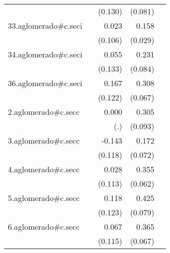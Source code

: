 {\begin{longtable}{l*{4}{D{.}{.}{-1}}}
            &                     &     (0.130)         &     (0.081)         &                     \\
\addlinespace
33.aglomerado#c.seci&                     &       0.023         &       0.158\sym{***}&                     \\
            &                     &     (0.106)         &     (0.029)         &                     \\
\addlinespace
34.aglomerado#c.seci&                     &       0.055         &       0.231\sym{**} &                     \\
            &                     &     (0.133)         &     (0.084)         &                     \\
\addlinespace
36.aglomerado#c.seci&                     &       0.167         &       0.308\sym{***}&                     \\
            &                     &     (0.122)         &     (0.067)         &                     \\
\addlinespace
2.aglomerado#c.secc&                     &       0.000         &       0.305\sym{**} &                     \\
            &                     &         (.)         &     (0.093)         &                     \\
\addlinespace
3.aglomerado#c.secc&                     &      -0.143         &       0.172\sym{*}  &                     \\
            &                     &     (0.118)         &     (0.072)         &                     \\
\addlinespace
4.aglomerado#c.secc&                     &       0.028         &       0.355\sym{***}&                     \\
            &                     &     (0.113)         &     (0.062)         &                     \\
\addlinespace
5.aglomerado#c.secc&                     &       0.118         &       0.425\sym{***}&                     \\
            &                     &     (0.123)         &     (0.079)         &                     \\
\addlinespace
6.aglomerado#c.secc&                     &       0.067         &       0.365\sym{***}&                     \\
            &                     &     (0.115)         &     (0.067)         &                     \\

\end{longtable}}
